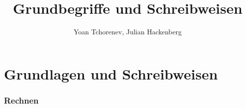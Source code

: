 \documentclass[12pt,a4paper]{article}
\title{Grundbegriffe und Schreibweisen}
\author{Yoan Tchorenev, Julian Hackenberg}
\begin{document}
    \begin{titlepage}
        \maketitle
        \tableofcontents
    \end{titlepage}

    \part{Grundlagen und Schreibweisen}\label{part:grundlagen-und-schreibweisen}
    

    \section{Rechnen}\label{sec:rechnen}
    
\end{document}
